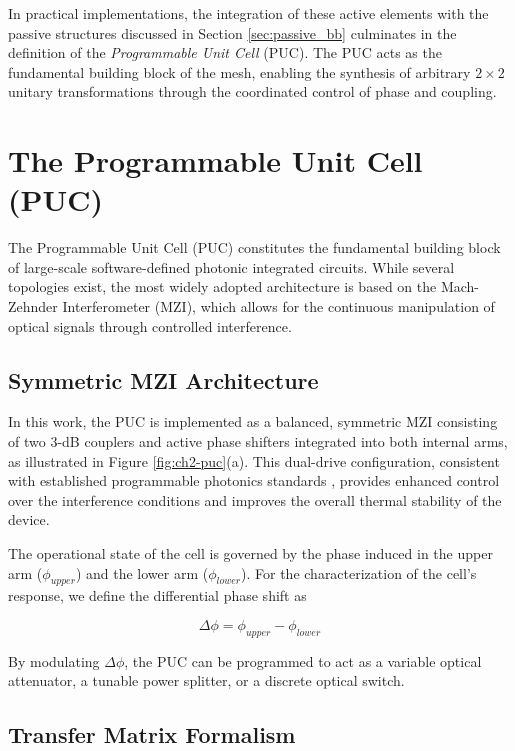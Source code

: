 In practical implementations, the integration of these active elements with the passive structures 
discussed in Section \ref{sec:passive_bb} culminates in the definition of the 
\textit{Programmable Unit Cell} (PUC). The PUC acts as the fundamental building block of the mesh, 
enabling the synthesis of arbitrary $2 \times 2$ unitary transformations through the coordinated 
control of phase and coupling.



\section{The Programmable Unit Cell (PUC)}
\label{sec:ch2-puc}

The Programmable Unit Cell (PUC) constitutes the fundamental building block of large-scale 
software-defined photonic integrated circuits. While several topologies exist, the most widely 
adopted architecture is based on the Mach-Zehnder Interferometer (MZI), which allows for the 
continuous manipulation of optical signals through controlled interference.

\subsection{Symmetric MZI Architecture}

In this work, the PUC is implemented as a balanced, symmetric MZI consisting of two $3$-dB 
couplers and active phase shifters integrated into both internal arms, as illustrated in 
Figure \ref{fig:ch2-puc}(a). This dual-drive configuration, consistent with established 
programmable photonics standards \cite{capmanyProgrammableIntegratedPhotonics2020}, provides 
enhanced control over the interference conditions and improves the overall thermal stability of the 
device.

The operational state of the cell is governed by the phase induced in the upper arm ($\phi_{upper}$) 
and the lower arm ($\phi_{lower}$). For the characterization of the cell's response, we define the 
differential phase shift as

\begin{equation}
\Delta\phi = \phi_{upper} - \phi_{lower}
\label{eq:delta_phi}
\end{equation}

By modulating $\Delta\phi$, the PUC can be programmed to act as a variable optical attenuator, a 
tunable power splitter, or a discrete optical switch.

\subsection{Transfer Matrix Formalism}

